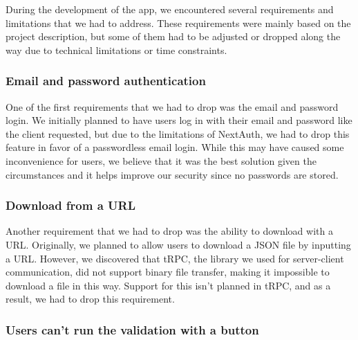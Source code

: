
\noindent
During the development of the app, we encountered several requirements and limitations that we had to address. These requirements were mainly based on the project description, but some of them had to be adjusted or dropped along the way due to technical limitations or time constraints.

\subsubsection{Email and password authentication}

One of the first requirements that we had to drop was the email and password login. We initially planned to have users log in with their email and password like the client requested, but due to the limitations of NextAuth, \cite{NextAuth_limitations} we had to drop this feature in favor of a passwordless email login. While this may have caused some inconvenience for users, we believe that it was the best solution given the circumstances and it helps improve our security since no passwords are stored.

\subsubsection{Download from a URL}

Another requirement that we had to drop was the ability to download with a URL. Originally, we planned to allow users to download a JSON file by inputting a URL. However, we discovered that tRPC, the library we used for server-client communication, did not support binary file transfer, making it impossible to download a file in this way. Support for this isn't planned in tRPC, and as a result, we had to drop this requirement. \cite{lkj4_tRPC_limitation}


\subsubsection{Users can't run the validation with a button}

